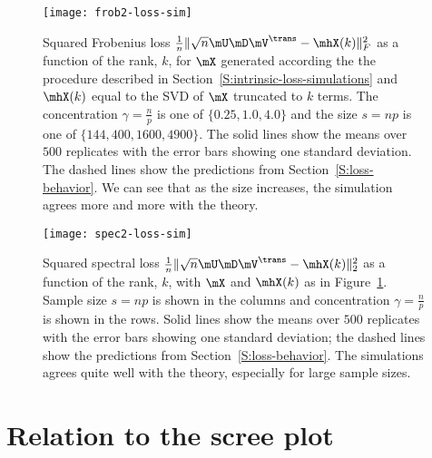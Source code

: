 \begin{figure}[tbh]
    \centering
    \texttt{[image: frob2-loss-sim]}
    \caption{
        Squared Frobenius loss
        \(
            \frac{1}{n} \| \sqrt{n}\mU \mD \mV^\trans - \mhX(k) \|_F^2
        \)
        as a function of the rank, $k$, for
        $\mX$ generated according the the procedure described
        in Section~\ref{S:intrinsic-loss-simulations} and $\mhX(k)$ equal
        to the SVD of $\mX$ truncated to $k$ terms.  The concentration 
        $\gamma = \frac{n}{p}$ is one of $\{ 0.25, 1.0, 4.0 \}$ and the
        size $s = n p$ is one of $\{ 144, 400, 1600, 4900 \}$.  
        The solid lines show the means over $500$ replicates with the error 
        bars showing one standard deviation.  The dashed lines show the 
        predictions from Section~\ref{S:loss-behavior}.  We can see that as 
        the size increases, the simulation agrees more and more with the 
        theory.
    }\label{F:frob2-loss-sim}
\end{figure}

\begin{figure}[hbt]
    \centering
    \texttt{[image: spec2-loss-sim]}
    \caption{
        Squared spectral loss
        \(
            \frac{1}{n} \| \sqrt{n}\mU \mD \mV^\trans - \mhX(k) \|_2^2
        \)
        as a function of the rank, $k$, with $\mX$ and $\mhX(k)$ as in
        Figure~\ref{F:frob2-loss-sim}.  Sample size $s = n p$ is shown in the 
        columns and concentration $\gamma = \frac{n}{p}$ is shown in the rows.
        Solid lines show the means
        over $500$ replicates with the error bars showing one standard 
        deviation; the dashed lines show the predictions from 
        Section~\ref{S:loss-behavior}.  The simulations agrees quite well
        with the theory, especially for large sample sizes.
    }\label{F:spec2-loss-sim}
\end{figure}

\clearpage

\section{Relation to the scree plot}
